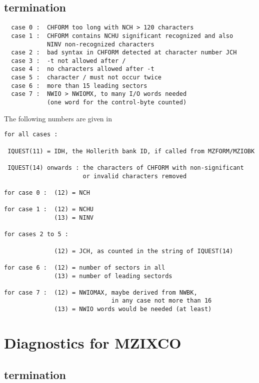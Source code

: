 \subsection*{ termination}

\begin{verbatim}
  case 0 :  CHFORM too long with NCH > 120 characters
  case 1 :  CHFORM contains NCHU significant recognized and also
            NINV non-recognized characters
  case 2 :  bad syntax in CHFORM detected at character number JCH
  case 3 :  -t not allowed after /
  case 4 :  no characters allowed after -t
  case 5 :  character / must not occur twice
  case 6 :  more than 15 leading sectors
  case 7 :  NWIO > NWIOMX, to many I/O words needed
            (one word for the control-byte counted)
\end{verbatim}

The following numbers are given in 

\begin{verbatim}
for all cases :

 IQUEST(11) = IDH, the Hollerith bank ID, if called from MZFORM/MZIOBK

 IQUEST(14) onwards : the characters of CHFORM with non-significant
                      or invalid characters removed

for case 0 :  (12) = NCH

for case 1 :  (12) = NCHU
              (13) = NINV

for cases 2 to 5 :

              (12) = JCH, as counted in the string of IQUEST(14)

for case 6 :  (12) = number of sectors in all
              (13) = number of leading sectords

for case 7 :  (12) = NWIOMAX, maybe derived from NWBK,
                              in any case not more than 16
              (13) = NWIO words would be needed (at least)
\end{verbatim}

\section{Diagnostics for MZIXCO}


\subsection*{ termination}

